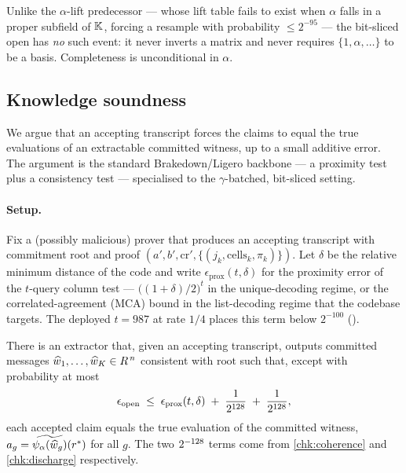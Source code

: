\begin{remark}
Unlike the $\alpha$-lift predecessor --- whose lift table fails to exist
when $\alpha$ falls in a proper subfield of $\mathbb{K}$, forcing a resample with
probability $\le 2^{-95}$ --- the bit-sliced open has \emph{no} such
event: it never inverts a matrix and never requires $\{1,\alpha,\dots\}$
to be a basis. Completeness is unconditional in $\alpha$.
\end{remark}

\subsection{Knowledge soundness}

We argue that an accepting transcript forces the claims to equal the true
evaluations of an extractable committed witness, up to a small additive
error. The argument is the standard Brakedown/Ligero backbone --- a
proximity test plus a consistency test --- specialised to the
$\gamma$-batched, bit-sliced setting.

\paragraph{Setup.} Fix a (possibly malicious) prover that produces an
accepting transcript with commitment $\mathrm{root}$ and proof
$(a', b', \mathrm{cr}', \{(j_k,\text{cells}_k,\pi_k)\})$. Let $\delta$ be
the relative minimum distance of the code and write
$\epsilon_{\mathrm{prox}}(t,\delta)$ for the proximity error of the
$t$-query column test --- $\bigl((1+\delta)/2\bigr)^t$ in the
unique-decoding regime, or the correlated-agreement (MCA) bound in the
list-decoding regime that the codebase targets. The deployed
$t = 987$ at rate $1/4$ places this term below $2^{-100}$
().

\begin{theorem}
\label{thm:soundness}
There is an extractor that, given an accepting transcript, outputs
committed messages $\widehat w_1,\dots,\widehat w_K \in R^{\,n}$
consistent with $\mathrm{root}$ such that, except with probability at most
\[
  \epsilon_{\mathrm{open}}
  \;\le\;
  \epsilon_{\mathrm{prox}}(t,\delta)
  \;+\;
  \frac{1}{2^{128}}
  \;+\;
  \frac{1}{2^{128}},
\]
each accepted claim equals the true evaluation of the committed witness,
$a_g = \widetilde{\psi_{\alpha}(\widehat w_g)}(r^*)$ for all $g$. The two
$2^{-128}$ terms come from \ref{chk:coherence} and \ref{chk:discharge}
respectively.
\end{theorem}

